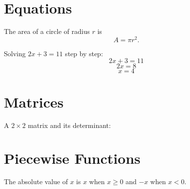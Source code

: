 \documentclass{article}
\begin{document}
\section{Equations}
The area of a circle of radius $r$ is
\[
  A = \pi r^2 .
\]

Solving $2x + 3 = 11$ step by step:
\[
  2x + 3 = 11
\]
\[
  2x = 8
\]
\[
  x = 4
\]

\section{Matrices}
A $2 \times 2$ matrix and its determinant:

\section{Piecewise Functions}
The absolute value of $x$ is $x$ when $x \geq 0$ and $-x$ when $x < 0$.
\end{document}
